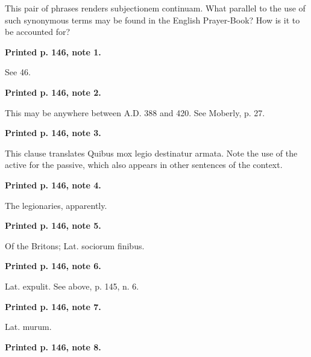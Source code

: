 This pair of phrases renders subjectionem continuam. What parallel to the use of such synonymous terms may be found in the English Prayer-Book? How is it to be accounted for?

\textbf{Printed p. 146, note 1.}

See 46.

\textbf{Printed p. 146, note 2.}

This may be anywhere between A.D. 388 and 420. See Moberly, p. 27.

\textbf{Printed p. 146, note 3.}

This clause translates Quibus mox legio destinatur armata. Note the use of the active for the passive, which also appears in other sentences of the context.

\textbf{Printed p. 146, note 4.}

The legionaries, apparently.

\textbf{Printed p. 146, note 5.}

Of the Britons; Lat. sociorum finibus.

\textbf{Printed p. 146, note 6.}

Lat. expulit. See above, p. 145, n. 6.

\textbf{Printed p. 146, note 7.}

Lat. murum.

\textbf{Printed p. 146, note 8.}

